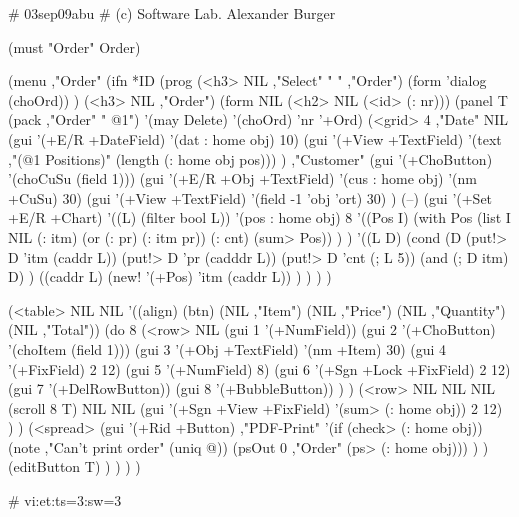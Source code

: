 \begin{wideverbatim}

# 03sep09abu
# (c) Software Lab. Alexander Burger

(must "Order" Order)

(menu ,"Order"
   (ifn *ID
      (prog
         (<h3> NIL ,"Select" " " ,"Order")
         (form 'dialog (choOrd)) )
      (<h3> NIL ,"Order")
      (form NIL
         (<h2> NIL (<id> (: nr)))
         (panel T (pack ,"Order" " @1") '(may Delete) '(choOrd) 'nr '+Ord)
         (<grid> 4
            ,"Date" NIL
            (gui '(+E/R +DateField) '(dat : home obj) 10)
            (gui '(+View +TextField)
               '(text ,"(@1 Positions)" (length (: home obj pos))) )
            ,"Customer" (gui '(+ChoButton) '(choCuSu (field 1)))
            (gui '(+E/R +Obj +TextField) '(cus : home obj) '(nm +CuSu) 30)
            (gui '(+View +TextField) '(field -1 'obj 'ort) 30) )
         (--)
         (gui '(+Set +E/R +Chart) '((L) (filter bool L)) '(pos : home obj) 8
            '((Pos I)
               (with Pos
                  (list I NIL (: itm) (or (: pr) (: itm pr)) (: cnt) (sum> Pos)) ) )
            '((L D)
               (cond
                  (D
                     (put!> D 'itm (caddr L))
                     (put!> D 'pr (cadddr L))
                     (put!> D 'cnt (; L 5))
                     (and (; D itm) D) )
                  ((caddr L)
                     (new! '(+Pos) 'itm (caddr L)) ) ) ) )


\end{wideverbatim}

\begin{wideverbatim}


         (<table> NIL NIL
            '((align) (btn) (NIL ,"Item") (NIL ,"Price") (NIL ,"Quantity") (NIL ,"Total"))
            (do 8
               (<row> NIL
                  (gui 1 '(+NumField))
                  (gui 2 '(+ChoButton) '(choItem (field 1)))
                  (gui 3 '(+Obj +TextField) '(nm +Item) 30)
                  (gui 4 '(+FixField) 2 12)
                  (gui 5 '(+NumField) 8)
                  (gui 6 '(+Sgn +Lock +FixField) 2 12)
                  (gui 7 '(+DelRowButton))
                  (gui 8 '(+BubbleButton)) ) )
            (<row> NIL NIL NIL (scroll 8 T) NIL NIL
               (gui '(+Sgn +View +FixField) '(sum> (: home obj)) 2 12) ) )
         (<spread>
            (gui '(+Rid +Button) ,"PDF-Print"
               '(if (check> (: home obj))
                  (note ,"Can't print order" (uniq @))
                  (psOut 0 ,"Order" (ps> (: home obj))) ) )
            (editButton T) ) ) ) )

# vi:et:ts=3:sw=3


\end{wideverbatim}


